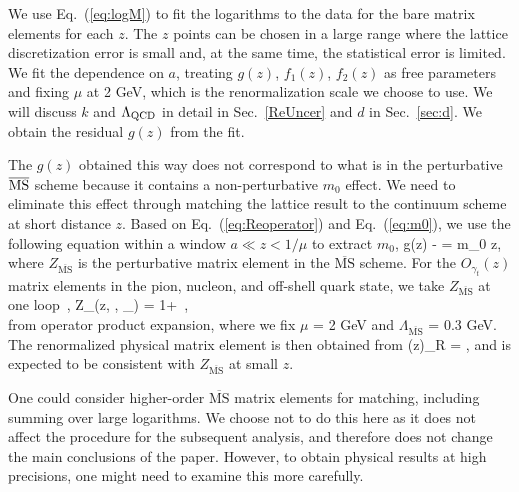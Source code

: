 We use Eq.~(\ref{eq:logM}) to fit the logarithms to the data for the bare matrix elements for each $z$. The $z$ points can be chosen in 
a large range where the lattice discretization error is small and, at the same time, the statistical error is limited. We fit the dependence on $a$, treating $g(z)$, $f_{1}(z)$, $f_{2}(z)$ as free parameters and fixing $\mu$ at 2 GeV, which is the renormalization scale we choose to use. We will discuss $k$ and $\Lambda_{\rm QCD}$ in detail in Sec.~\ref{ReUncer} and $d$ in Sec.~\ref{sec:d}. We obtain the residual $g(z)$ from the fit.

The $g(z)$ obtained this way does not correspond to what is in the perturbative $\overline{\rm MS}$ scheme because it contains a non-perturbative $m_{0}$ effect. 
We need to eliminate this effect through matching the lattice result to the continuum scheme at short distance $z$. Based on Eq.~(\ref{eq:Reoperator}) and Eq.~(\ref{eq:m0}), we use the following equation within a window $a \ll z < 1/\mu$ to extract $m_{0}$,   
\bea\label{eq:gztoMS}
g(z) -  = m_{0} z,
\eea
where $Z_{\overline{\mathrm{MS}}}$ is the perturbative matrix element in the $\overline{\mathrm{MS}}$ scheme. For the $O_{\gamma_t}(z)$ matrix elements in the pion, nucleon, and off-shell quark state, we take $Z_{\overline{\mathrm{MS}}}$ at one loop~\cite{Izubuchi:2018srq},
\bea\label{eq:ZMS}
Z_{}(z, \mu, \Lambda_{}) = 1+\ , \nonumber\\
\eea
from operator product expansion, where we fix $\mu$ = 2 GeV and $\Lambda_{\overline{\mathrm{MS}}}$ = 0.3 GeV. 
The renormalized physical matrix element is then obtained from
\bea\label{eq:gz-m0}
(z)_{R} = \exp[g(z) - m_{0}z],
\eea
and is expected to be consistent with $Z_{\overline{\mathrm{MS}}}$ at small $z$.

One could consider higher-order $\overline{\mathrm{MS}}$ matrix elements for matching, including summing over large logarithms. We choose not to do this here as it does not affect the procedure for the subsequent analysis, and therefore does not change the main conclusions of the paper. However,
to obtain physical results at high precisions, one might need to examine this more carefully. 

